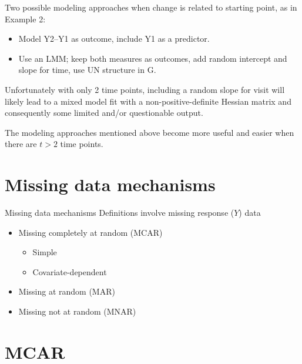 \documentclass[
  9pt,
  ignorenonframetext,
]{beamer}
\begin{document}
\begin{frame}{}
\protect\hypertarget{section-2}{}
Two possible modeling approaches when change is related to starting
point, as in Example 2:

\begin{itemize}
\item
  Model Y2--Y1 as outcome, include Y1 as a predictor.
\item
  Use an LMM; keep both measures as outcomes, add random intercept and
  slope for time, use UN structure in G.
\end{itemize}

Unfortunately with only 2 time points, including a random slope for
visit will likely lead to a mixed model fit with a non-positive-definite
Hessian matrix and consequently some limited and/or questionable output.

The modeling approaches mentioned above become more useful and easier
when there are \(t>2\) time points.
\end{frame}

\hypertarget{missing-data-mechanisms}{%
\section{Missing data mechanisms}\label{missing-data-mechanisms}}

\begin{frame}{Missing data mechanisms}
\protect\hypertarget{missing-data-mechanisms-1}{}
Definitions involve missing response (\(Y\)) data

\begin{itemize}
\item
  Missing completely at random (MCAR)

  \begin{itemize}
  \item
    Simple
  \item
    Covariate-dependent
  \end{itemize}
\item
  Missing at random (MAR)
\item
  Missing not at random (MNAR)
\end{itemize}
\end{frame}

\hypertarget{mcar}{%
\section{MCAR}\label{mcar}}
\end{document}
